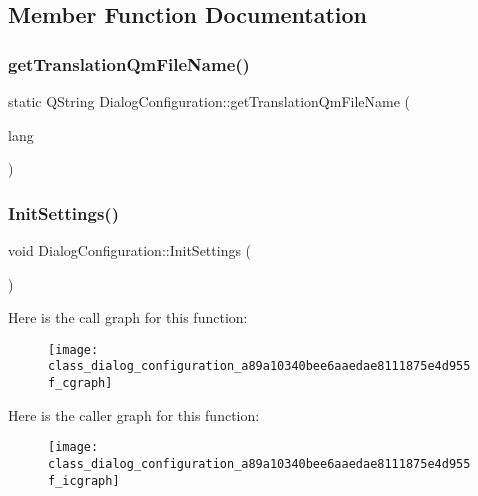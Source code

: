 \subsection{Member Function Documentation}
\mbox{\label{class_dialog_configuration_a9f8e92c1a10c3b510f2a841ce897e251}} 
\subsubsection{get\+Translation\+Qm\+File\+Name()}
{\footnotesize\ttfamily static Q\+String Dialog\+Configuration\+::get\+Translation\+Qm\+File\+Name (\begin{DoxyParamCaption}\item[{Q\+String}]{lang }\end{DoxyParamCaption})\hspace{0.3cm}{\ttfamily [static]}}

\mbox{\label{class_dialog_configuration_a89a10340bee6aaedae8111875e4d955f}} 
\subsubsection{Init\+Settings()}
{\footnotesize\ttfamily void Dialog\+Configuration\+::\+Init\+Settings (\begin{DoxyParamCaption}{ }\end{DoxyParamCaption})}

Here is the call graph for this function\+:\nopagebreak
\begin{figure}[H]
\begin{center}
\leavevmode
\texttt{[image: class\_dialog\_configuration\_a89a10340bee6aaedae8111875e4d955f\_cgraph]}
\end{center}
\end{figure}
Here is the caller graph for this function\+:\nopagebreak
\begin{figure}[H]
\begin{center}
\leavevmode
\texttt{[image: class\_dialog\_configuration\_a89a10340bee6aaedae8111875e4d955f\_icgraph]}
\end{center}
\end{figure}
\mbox{\label{class_dialog_configuration_a16c3d334fcc7169be13e364fa56b5d11}} 
